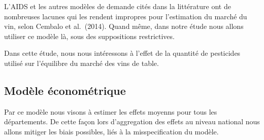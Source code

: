 \documentclass[11pt,]{article}
\begin{document}
L'AIDS et les autres modèles de demande cités dans la littérature ont de
nombreuses lacunes qui les rendent impropres pour l'estimation du marché
du vin, selon Cembalo et al.~(2014). Quand même, dans notre étude nous
allons utiliser ce modèle là, sous des suppositions restrictives.

\par

Dans cette étude, nous nous intéressons à l'effet de la quantité de
pesticides utilisé sur l'équilibre du marché des vins de table.

\hypertarget{modele-econometrique}{%
\subsection{Modèle économétrique}\label{modele-econometrique}}

Par ce modèle nous visons à estimer les effets moyenns pour tous les
départements. De cette façon lors d'aggregation des effets au niveau
national nous allons mitiger les biais possibles, liés à la
misspecification du modèle.

\par
\end{document}
